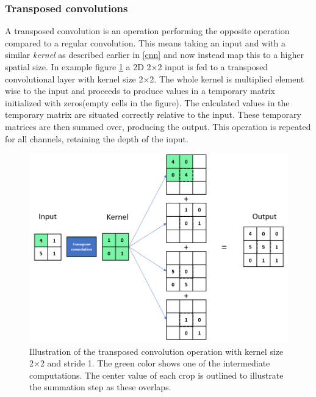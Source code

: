     

\subsubsection{Transposed convolutions}
    A transposed convolution is an operation performing the opposite operation compared to a regular convolution\cite{dumoulin2016guide_transposed_convolution}. This means taking an input and with a similar \textit{kernel} as described earlier in \ref{cnn} and now instead map this to a higher spatial size. In example figure \ref{transposed_conv_fig} a 2D 2×2 input is fed to a transposed convolutional layer with kernel size 2×2. The whole kernel is multiplied element wise to the input and proceeds to produce values in a temporary matrix initialized with zeros(empty cells in the figure). The calculated values in the temporary matrix are situated correctly relative to the input. These temporary matrices are then summed over, producing the output. This operation is repeated for all channels, retaining the depth of the input. 
    
    \begin{figure}[H]
        \centering
        \includegraphics[scale=0.5]{figures/transpose_convolution.png}
        \caption[Transposed convolution]{Illustration of the transposed convolution operation with kernel size 2×2 and stride 1. The green color shows one of the intermediate computations. The center value of each crop is outlined to illustrate the summation step as these overlaps.}
      	\medskip 
        \label{transposed_conv_fig}
    \end{figure}
    
